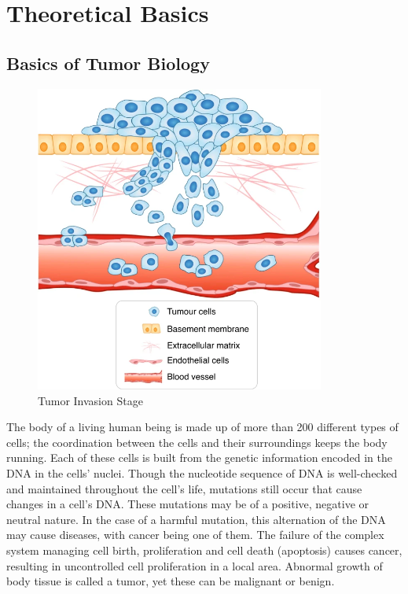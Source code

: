 \section{Theoretical Basics}
\label{sec:theoretical_basics}
\subsection{Basics of Tumor Biology}
\begin{figure}[h]
    \centering
    \includegraphics[width=0.85\textwidth]{resources/images/tumour_invasion_stage.png}
    \caption{Tumor Invasion Stage}
    \label{fig:tumor_invasion_stage}
\end{figure}

The body of a living human being is made up of more than 200 different types of cells; the coordination between the cells and their surroundings keeps the body running. Each of these cells is built from the genetic information encoded in the DNA in the cells' nuclei. Though the nucleotide sequence of DNA is well-checked and maintained throughout the cell's life, mutations still occur that cause changes in a cell's DNA. These mutations may be of a positive, negative or neutral nature. In the case of a harmful mutation, this alternation of the DNA may cause diseases, with cancer being one of them. The failure of the complex system managing cell birth, proliferation and cell death (apoptosis) causes cancer, resulting in uncontrolled cell proliferation in a local area. Abnormal growth of body tissue is called a tumor, yet these can be malignant or benign. 

